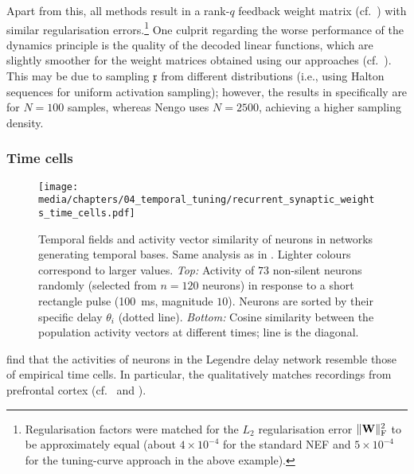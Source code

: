 Apart from this, all methods result in a rank-$q$ feedback weight matrix (cf.~) with similar regularisation errors.\footnote{Regularisation factors were matched for the $L_2$ regularisation error $\|\mathbf{W}\|_\mathrm{F}^2$ to be approximately equal (about $4 \times 10^{-4}$ for the standard NEF and $5 \times 10^{-4}$ for the tuning-curve approach in the above example).}
One culprit regarding the worse performance of the \NEF dynamics principle is the quality of the decoded linear functions, which are slightly smoother for the weight matrices obtained using our approaches (cf.~).
This may be due to sampling $\mathfrak{x}$ from different distributions (i.e., using Halton sequences for uniform activation sampling); however, the results in  specifically are for $N = 100$ samples, whereas Nengo uses $N = 2500$, achieving a higher sampling density.

\subsubsection{Time cells}

\begin{figure}
	\centering
	\texttt{[image: media/chapters/04\_temporal\_tuning/recurrent\_synaptic\_weights\_time\_cells.pdf]}%
	{\label{fig:recurrent_synaptic_weights_time_cells_a}}%
	{\label{fig:recurrent_synaptic_weights_time_cells_b}}%
	{\label{fig:recurrent_synaptic_weights_time_cells_c}}%
	\caption[Temporal fields and activity vector similarity of networks generating temporal bases]{
		Temporal fields and activity vector similarity of neurons in networks generating temporal bases.
		Same analysis as in .
		Lighter colours correspond to larger values.
		\emph{Top:} Activity of $73$ non-silent neurons randomly (selected from $n = 120$ neurons) in response to a short rectangle pulse (\SI{100}{\milli\second}, magnitude $10$). Neurons are sorted by their specific delay $\theta_i$ (dotted line).
		\emph{Bottom:} Cosine similarity between the population activity vectors at different times; line is the diagonal.
	}
	\label{fig:recurrent_synaptic_weights_time_cells}
\end{figure}

 find that the activities of neurons in the Legendre delay network resemble those of empirical time cells.
In particular, the \LDN qualitatively matches recordings from prefrontal cortex (cf.~\cite{tiganj2016sequential} and ).

